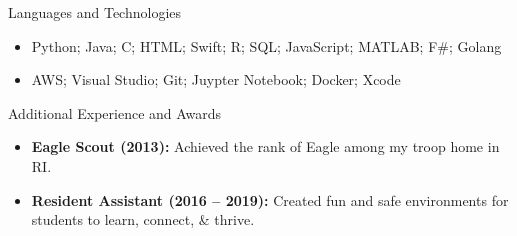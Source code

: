 \documentclass[]{mcdowellcv}
\begin{document}
	\begin{cvsection}{Languages and Technologies}
		\begin{cvsubsection}{}{}{}	
			\begin{itemize}
				\item Python; Java; C; HTML; Swift; R; SQL; JavaScript; MATLAB; F\#; Golang
				\item AWS; Visual Studio; Git; Juypter Notebook; Docker; Xcode
			\end{itemize}
		\end{cvsubsection}
	\end{cvsection}

	\begin{cvsection}{Additional Experience and Awards}
		\begin{cvsubsection}{}{}{}	
			\begin{itemize}
				\item \textbf{Eagle Scout (2013):} Achieved the rank of Eagle among my troop home in RI.
				\item \textbf{Resident Assistant (2016 -- 2019):} Created fun and safe environments for students to learn, connect, \& thrive.
			\end{itemize}
		\end{cvsubsection}
	\end{cvsection}
		
\end{document}
